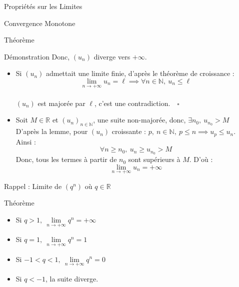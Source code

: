 \documentclass{coursbook}
\begin{document}
\begin{Gpartie}{Propriétés sur les Limites}
\begin{Spartie}{Convergence Monotone}
\begin{SSpartie}{Théorème}
\begin{SSSpartie}{Démonstration}
                    Donc, $(u_n)$ diverge vers $+\infty$.
                    \begin{itemize}
                        \item Si $(u_n)$ admettait une limite finie, d'après le théorème de croissance :	
                        \[\lim\limits_{n\to +\infty}u_n=\ell\implies\forall n\in\mathbb{N},\ u_n\leq\ell\] \\ $(u_n)$ est majorée par $\ell$, c'est une contradiction.$\quad\square$
                        \item Soit $M\in\mathbb{R}$ et $(u_n)_{n\in\mathbb{N}}$, une suite non-majorée, donc, $\exists n_0,\ u_{n_0}>M$ \\ D'après la lemme, pour $(u_n)$ croissante : $p,~n\in\mathbb{N},\ p\leq n\implies u_p\leq u_n$. \\ Ainsi : \[\forall n\geq n_0,\ u_n\geq u_{n_0}>M\] Donc, tous les termes à partir de $n_0$ sont supérieurs à $M$. D'où : \[\lim\limits_{n\to +\infty}u_n=+\infty\]
                    \end{itemize}
                \end{SSSpartie}
            \end{SSpartie}
        \end{Spartie}
        \begin{Spartie}{Rappel : Limite de $\left(q^n\right)$ où $q\in\mathbb{R}$} 
            \begin{SSpartie}{Théorème} 
                \begin{itemize}
                    \setlength\itemsep{0.5em}
                    \item Si $q>1,~\lim\limits_{n\to+\infty}q^n=+\infty$
                    \item Si $q=1,~\lim\limits_{n\to+\infty}q^n=1$
                    \item Si $-1<q<1,~\lim\limits_{n\to+\infty}q^n=0$
                    \item Si $q<-1$, la suite diverge.
                \end{itemize}
            \end{SSpartie}
        \end{Spartie}
    \end{Gpartie}
    \pagebreak
\end{document}
